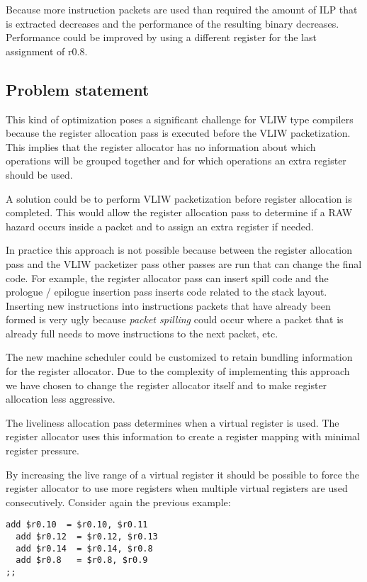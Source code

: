 Because more instruction packets are used than required the amount of ILP that is extracted decreases and the performance of the resulting binary decreases. Performance could be improved by using a different register for the last assignment of r0.8. 

\subsection{Problem statement}
This kind of optimization poses a significant challenge for VLIW type compilers because the register allocation pass is executed before the VLIW packetization. This implies that the register allocator has no information about which operations will be grouped together and for which operations an extra register should be used.

A solution could be to perform VLIW packetization before register allocation is completed. This would allow the register allocation pass to determine if a RAW hazard occurs inside a packet and to assign an extra register if needed.

In practice this approach is not possible because between the register allocation pass and the VLIW packetizer pass other passes are run that can change the final code. For example, the register allocator pass can insert spill code and the prologue / epilogue insertion pass inserts code related to the stack layout. Inserting new instructions into instructions packets that have already been formed is very ugly because \emph{packet spilling} could occur where a packet that is already full needs to move instructions to the next packet, etc. 

The new machine scheduler could be customized to retain bundling information for the register allocator. Due to the complexity of implementing this approach we have chosen to change the register allocator itself and to make register allocation less aggressive. 

The liveliness allocation pass determines when a virtual register is used. The register allocator uses this information to create a register mapping with minimal register pressure.

By increasing the live range of a virtual register it should be possible to force the register allocator to use more registers when multiple virtual registers are used consecutively. Consider again the previous example:

\begin{lstlisting}[language=rvex]
  add $r0.10  = $r0.10, $r0.11
  add $r0.12  = $r0.12, $r0.13
  add $r0.14  = $r0.14, $r0.8
  add $r0.8   = $r0.8, $r0.9
;;
\end{lstlisting}

